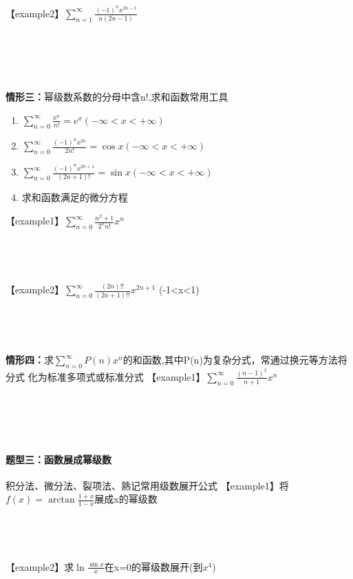 \documentclass[12pt]{scrartcl}
\begin{document}
{\noindent【example2】$\sum_{n = 1}^{\infty}\frac{(-1)^nx^{2n-1}}{n(2n-1)} $\leavevmode \newline
\\
\\
\\
\\
\\
\\

\noindent\textbf{情形三：}幂级数系数的分母中含n!,求和函数常用工具
\begin{enumerate}[label={\alph*}] 
    \item $\sum_{n = 0}^{\infty}\frac{x^n}{n!} =e^x(-\infty <x<+\infty )  $
    \item $\sum_{n = 0}^{\infty}\frac{(-1)^nx^{2n}}{2n!} =\cos x(-\infty <x<+\infty )  $
    \item $\sum_{n = 0}^{\infty}\frac{(-1)^nx^{2n+1}}{(2n+1)!} =\sin  x(-\infty <x<+\infty )  $
    \item 求和函数满足的微分方程
\end{enumerate}
【example1】$\sum_{n = 0}^{\infty}\frac{n^2+1}{2^nn!} x^n$
\\
\\
\\
\\
\\
【example2】$\sum_{n = 0}^{\infty}\frac{(2n)!!}{(2n+1)!!} x^{2n+1}$ (-1<x<1)
\\
\\
\\
\\
\\
\textbf{情形四：}求$\sum_{n = 0}^{\infty} P(n)x^n $的和函数,其中P(n)为复杂分式，常通过换元等方法将分式
化为标准多项式或标准分式\leavevmode \newline
【example1】$\sum_{n = 0}^{\infty}\frac{(n-1)^2}{n+1} x^n$
\\
\\
\\
\\
\\
\paragraph*{题型三：函数展成幂级数} \leavevmode \newline
积分法、微分法、裂项法、熟记常用级数展开公式\leavevmode \newline
【example1】将$f(x)=\arctan \frac{1+x}{1-x} $展成x的幂级数
\\
\\
\\
\\
\\
【example2】求$\ln \frac{\sin x}{x}$在x=0的幂级数展开(到$x^4$)\leavevmode \newline 
\\
\\
\\
\\
\\
}
\end{document}
